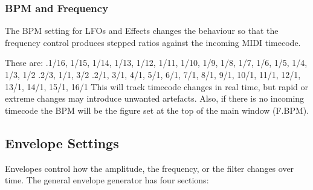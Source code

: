 \begin{flushleft}
  \begin{minipage}{\textwidth}
   \subsubsection{BPM and Frequency}
   \label{subsubsec:bpm_and_frequency}
   The BPM setting for LFOs and Effects changes the behaviour so that the frequency control
   produces stepped ratios against the incoming MIDI timecode.

   These are: \newline
    .\hspace{3em}1/16, 1/15, 1/14, 1/13, 1/12, 1/11, 1/10, 1/9, 1/8, 1/7, 1/6, 1/5, 1/4, 1/3, 1/2 \newline
    .\hspace{3em}2/3, 1/1, 3/2 \newline
    .\hspace{3em}2/1, 3/1, 4/1, 5/1, 6/1, 7/1, 8/1, 9/1, 10/1, 11/1, 12/1, 13/1, 14/1, 15/1, 16/1 \newline
    This will track timecode changes in real time, but rapid or extreme changes may
    introduce unwanted artefacts. Also, if there is no incoming timecode the BPM will be
    the figure set at the top of the main window (F.BPM).
  \end{minipage}
\end{flushleft}

\subsection{Envelope Settings}
\label{subsec:envelope_settings}

   Envelopes control how the amplitude, the frequency, or the filter changes
   over time.  The general envelope generator has four sections:

